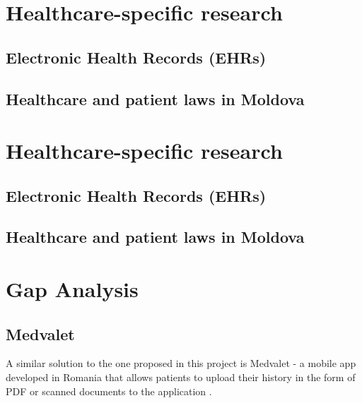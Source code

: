\section{Healthcare-specific research}

\subsection{Electronic Health Records (EHRs)}

\subsection{Healthcare and patient laws in Moldova}

\section{Healthcare-specific research}

\subsection{Electronic Health Records (EHRs)}

\subsection{Healthcare and patient laws in Moldova}

\section{Gap Analysis}

\subsection{Medvalet}

A similar solution to the one proposed in this project is Medvalet - a mobile app developed in Romania that allows patients to upload their history in the form of PDF or scanned documents to the application \parencite{medvalet}. 

